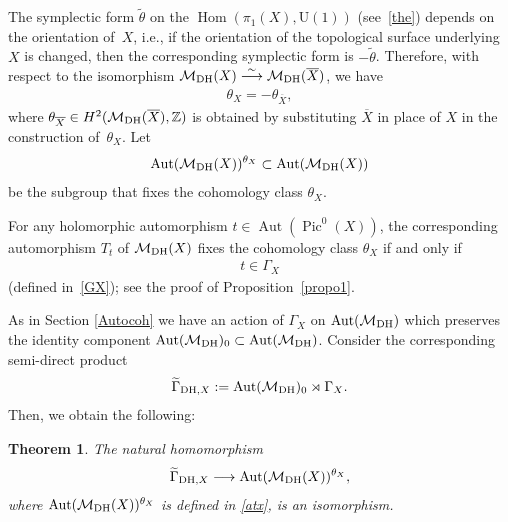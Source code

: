 \documentclass[pdftex]{sigma}
\numberwithin{equation}{section}
\newtheorem{Theorem}{Theorem}[section]
\begin{document}
The symplectic form $\widetilde\theta$ on the $\operatorname{Hom}(\pi_1(X), \text{U}(1))$ (see~\eqref{the}) depends on the orientation of~$X$, i.e., if the orientation of the topological surface underlying $X$ is changed, then the corresponding symplectic form is $-\widetilde\theta$. Therefore,
with respect to the isomorphism ${\mathcal M}_{\rm DH}(X) \stackrel{\sim}{\longrightarrow} {\mathcal M}_{\rm DH}(\overline{X})$, we have
\begin{gather*}
\theta_{X} = -\theta_{\overline X} ,
\end{gather*}
where $\theta_{\overline X} \in H^2({\mathcal M}_{\rm DH}({\overline X}), {\mathbb Z})$ is obtained by substituting ${\overline X}$ in place of $X$ in the construction of~$\theta_{X}$. Let
\begin{gather}\label{atx}
\operatorname{Aut}({\mathcal M}_{\rm DH}(X))^{\theta_X} \subset \operatorname{Aut}({\mathcal M}_{\rm DH}(X))
\end{gather}
be the subgroup that f\/ixes the cohomology class $\theta_X$.

For any holomorphic automorphism $t \in \operatorname{Aut}(\operatorname{Pic}^0(X))$, the corresponding automorphism $T_t$ of ${\mathcal M}_{\rm DH}(X)$ f\/ixes the cohomology class $\theta_X$ if and only if \begin{gather*}t \in \Gamma_X\end{gather*} (def\/ined in~\eqref{GX}); see the proof of Proposition~\ref{propo1}.

As in Section \ref{Autocoh} we have an action of $\Gamma_X$ on
$\operatorname{Aut}({\mathcal M}_{\rm DH})$ which preserves the
identity component $\operatorname{Aut}({\mathcal M}_{\rm DH})_0 \subset \operatorname{Aut}({\mathcal
M}_{\rm DH})$. Consider the corresponding semi-direct product
\begin{gather*}
\widetilde{\Gamma}_{{\rm DH},X} :=
\operatorname{Aut}({\mathcal M}_{\rm DH})_0\rtimes \Gamma_X .
\end{gather*}
Then, we obtain the following:

\begin{Theorem}The natural homomorphism \begin{gather*}\widetilde{\Gamma}_{{\rm DH},X} \longrightarrow
\operatorname{Aut}({\mathcal M}_{\rm DH}(X))^{\theta_X} ,\end{gather*} where $\operatorname{Aut}({\mathcal
M}_{\rm DH}(X))^{\theta_X}$ is defined in \eqref{atx}, is an isomorphism.
\end{Theorem}
\end{document}
